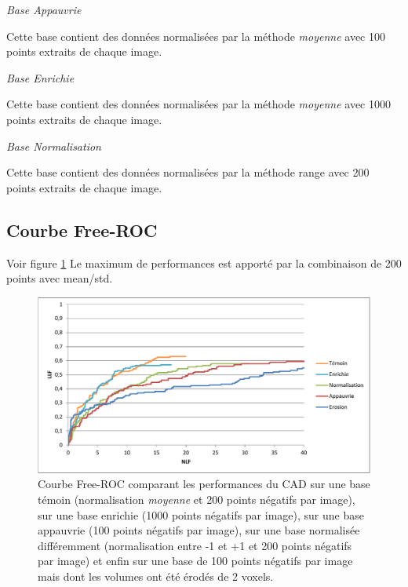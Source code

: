 \emph{Base Appauvrie}

Cette base contient des données normalisées par la méthode \emph{moyenne} avec 100 points extraits de chaque image.


\emph{Base Enrichie}

Cette base contient des données normalisées par la méthode \emph{moyenne} avec 1000 points extraits de chaque image.



\emph{Base Normalisation}

Cette base contient des données normalisées par la méthode range avec 200 points extraits de chaque image.


\subsection{Courbe Free-ROC}

Voir figure \ref{lab:froc_comp_static}
Le maximum de performances est apporté par la combinaison de 200 points avec mean/std.

\begin{figure}[h!]
 
 \begin{center}
   \includegraphics[width=15cm]{images/FROC_param}
 \end{center}
 \caption{\label{lab:froc_comp_static} Courbe Free-ROC comparant les performances du CAD sur une base témoin (normalisation \emph{moyenne} et 200 points négatifs par image), sur une base enrichie (1000 points négatifs par image), sur une base appauvrie (100 points négatifs par image), sur une base normalisée différemment (normalisation entre -1 et +1 et 200 points négatifs par image) et enfin sur une base de 100 points négatifs par image mais dont les volumes ont été érodés de 2 voxels.}

\end{figure}


